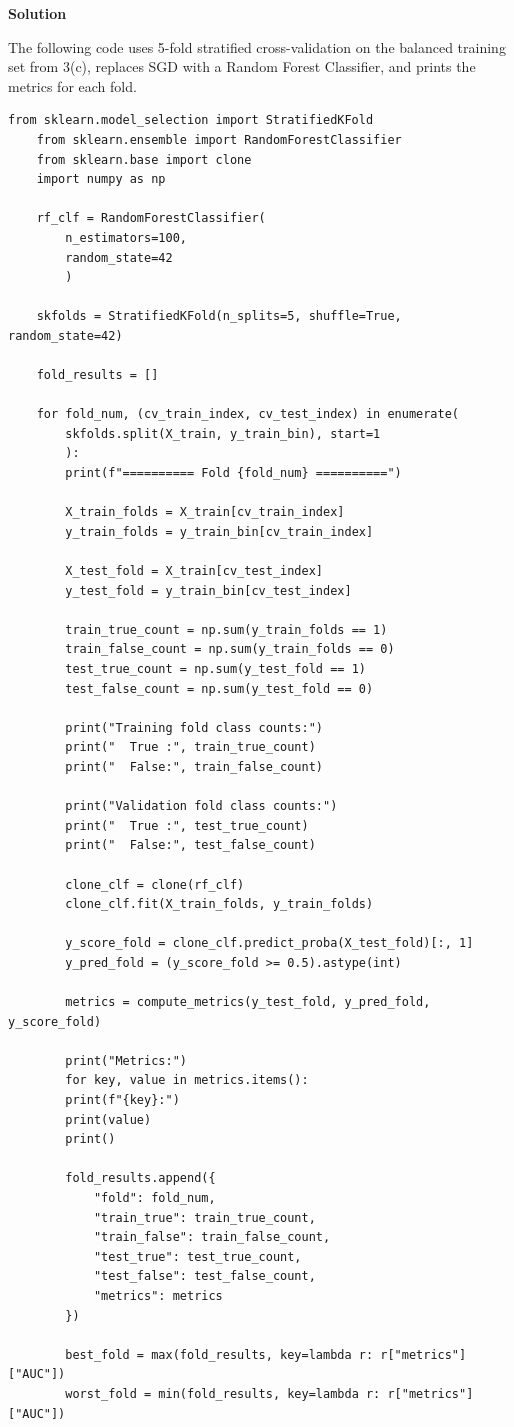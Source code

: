 \documentclass[11pt]{article}
\begin{document}
	\textbf{Solution}
	
	The following code uses 5-fold stratified cross-validation on the balanced training set from 3(c), replaces SGD with a Random Forest Classifier, and prints the metrics for each fold.
	
	\begin{lstlisting}[style=matlabstyle]
	from sklearn.model_selection import StratifiedKFold
	from sklearn.ensemble import RandomForestClassifier
	from sklearn.base import clone
	import numpy as np
		
	rf_clf = RandomForestClassifier(
		n_estimators=100,
		random_state=42
		)
		
	skfolds = StratifiedKFold(n_splits=5, shuffle=True, random_state=42)
		
	fold_results = []
		
	for fold_num, (cv_train_index, cv_test_index) in enumerate(
		skfolds.split(X_train, y_train_bin), start=1
		):
		print(f"========== Fold {fold_num} ==========")
		
		X_train_folds = X_train[cv_train_index]
		y_train_folds = y_train_bin[cv_train_index]
		
		X_test_fold = X_train[cv_test_index]
		y_test_fold = y_train_bin[cv_test_index]
		
		train_true_count = np.sum(y_train_folds == 1)
		train_false_count = np.sum(y_train_folds == 0)
		test_true_count = np.sum(y_test_fold == 1)
		test_false_count = np.sum(y_test_fold == 0)
		
		print("Training fold class counts:")
		print("  True :", train_true_count)
		print("  False:", train_false_count)
		
		print("Validation fold class counts:")
		print("  True :", test_true_count)
		print("  False:", test_false_count)
		
		clone_clf = clone(rf_clf)
		clone_clf.fit(X_train_folds, y_train_folds)
		
		y_score_fold = clone_clf.predict_proba(X_test_fold)[:, 1]
		y_pred_fold = (y_score_fold >= 0.5).astype(int)
		
		metrics = compute_metrics(y_test_fold, y_pred_fold, y_score_fold)
		
		print("Metrics:")
		for key, value in metrics.items():
		print(f"{key}:")
		print(value)
		print()
		
		fold_results.append({
			"fold": fold_num,
			"train_true": train_true_count,
			"train_false": train_false_count,
			"test_true": test_true_count,
			"test_false": test_false_count,
			"metrics": metrics
		})
		
		best_fold = max(fold_results, key=lambda r: r["metrics"]["AUC"])
		worst_fold = min(fold_results, key=lambda r: r["metrics"]["AUC"])
	\end{lstlisting}
	
\end{document}
